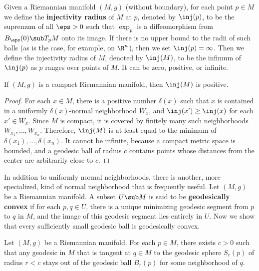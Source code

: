 Given a Riemannian manifold $(M,g)$ (without boundary), for each point $p\in M$ we define the \textbf{injectivity radius} of $M$ at $p$, denoted by $\inj(p)$, to be the supremum 
of all $\eps>0$ such that $\exp_p$ is a diffeomorphism from $B_\eps(0)\sub T_pM$ onto its image. If there is no upper bound to the radii of such balls (as is the case, 
for example, on $\R^n$), then we set $\inj(p)=\infty$. Then we define the injectivity radius of $M$, denoted by $\inj(M)$, to be the infimum of $\inj(p)$ as $p$ ranges 
over points of $M$. It can be zero, positive, or infinite.
\begin{lemma}\label{Riemann compact inj>0}
If $(M,g)$ is a compact Riemannian manifold, then $\inj(M)$ is positive.
\end{lemma}
\begin{proof}
For each $x\in M$, there is a positive number $\delta(x)$ such that $x$ is contained in a uniformly $\delta(x)$-normal neighborhood $W_x$, and $\inj(x')\geq\inj(x)$ for 
each $x'\in W_x$. Since $M$ is compact, it is covered by finitely many such neighborhoods $W_{x_1},\dots,W_{x_n}$. Therefore, $\inj(M)$ is at least equal to the minimum 
of $\delta(x_1),\dots,\delta(x_n)$. It cannot be infinite, because a compact metric space is bounded, and a geodesic ball of radius $c$ contains points whose distances 
from the center are arbitrarily close to $c$.
\end{proof}
In addition to uniformly normal neighborhoods, there is another, more specialized, kind of normal neighborhood that is frequently useful. Let $(M,g)$ be a Riemannian manifold. 
A subset $U\sub M$ is said to be \textbf{geodesically convex} if for each $p,q\in U$, there is a unique minimizing geodesic segment from $p$ to $q$ in $M$, and the image of this 
geodesic segment lies entirely in $U$. Now we show that every sufficiently small geodesic ball is geodesically convex.
\begin{lemma}\label{Riemann geodesic convex neighborhood lem}
Let $(M,g)$ be a Riemannian manifold. For each $p\in M$, there exists $c>0$ such that any geodesic in $M$ that is tangent at $q\in M$ to the geodesic sphere $S_r(p)$ of 
radius $r<c$ stays out of the geodesic ball $B_r(p)$ for some neighborhood of $q$.
\end{lemma}
